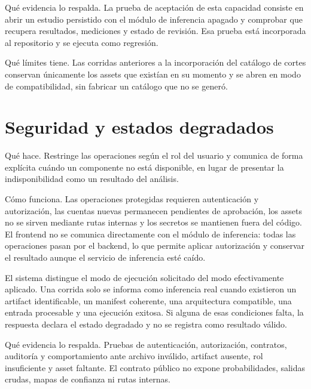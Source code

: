 Qué evidencia lo respalda. La prueba de aceptación de esta capacidad consiste en abrir un estudio persistido con el módulo de inferencia apagado y comprobar que recupera resultados, mediciones y estado de revisión. Esa prueba está incorporada al repositorio y se ejecuta como regresión.

Qué límites tiene. Las corridas anteriores a la incorporación del catálogo de cortes conservan únicamente los assets que existían en su momento y se abren en modo de compatibilidad, sin fabricar un catálogo que no se generó.

\section{Seguridad y estados degradados}

Qué hace. Restringe las operaciones según el rol del usuario y comunica de forma explícita cuándo un componente no está disponible, en lugar de presentar la indisponibilidad como un resultado del análisis.

Cómo funciona. Las operaciones protegidas requieren autenticación y autorización, las cuentas nuevas permanecen pendientes de aprobación, los assets no se sirven mediante rutas internas y los secretos se mantienen fuera del código. El frontend no se comunica directamente con el módulo de inferencia: todas las operaciones pasan por el backend, lo que permite aplicar autorización y conservar el resultado aunque el servicio de inferencia esté caído.

El sistema distingue el modo de ejecución solicitado del modo efectivamente aplicado. Una corrida solo se informa como inferencia real cuando existieron un artifact identificable, un manifest coherente, una arquitectura compatible, una entrada procesable y una ejecución exitosa. Si alguna de esas condiciones falta, la respuesta declara el estado degradado y no se registra como resultado válido.

Qué evidencia lo respalda. Pruebas de autenticación, autorización, contratos, auditoría y comportamiento ante archivo inválido, artifact ausente, rol insuficiente y asset faltante. El contrato público no expone probabilidades, salidas crudas, mapas de confianza ni rutas internas.

